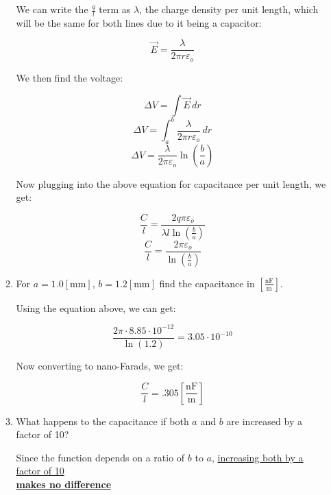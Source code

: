 \begin{enumerate}
\begin{enumerate}
        We can write the $\frac{q}{l}$ term as $\lambda$, the charge density per unit length, which will be the same for both lines due to it being a capacitor:

        $$\vec{E}=\frac{\lambda}{2\pi r\varepsilon_o}$$

        We then find the voltage:

        $$\Delta V=\int\vec{E}\,dr$$
        $$\Delta V=\int_a^b\frac{\lambda}{2\pi r\varepsilon_o}\,dr$$
        $$\Delta V=\frac{\lambda}{2\pi\varepsilon_o}\ln(\frac{b}{a})$$

        Now plugging into the above equation for capacitance per unit length, we get:

        $$\frac{C}{l}=\frac{2q\pi\varepsilon_o}{\lambda l\ln\left( \frac{b}{a} \right)}$$
        $$\boxed{\frac{C}{l}=\frac{2\pi\varepsilon_o}{\ln\left( \frac{b}{a} \right)}}$$

      \item For $a=1.0[\si{\milli\meter}]$, $b=1.2[\si{\milli\meter}]$ find the capacitance in $\left[ \frac{\si{\nano\farad}}{\si{\meter}} \right]$.

        Using the equation above, we can get:

        $$\frac{2\pi\cdot8.85\cdot10^{-12}}{\ln(1.2)}=3.05\cdot10^{-10}$$

        Now converting to nano-Farads, we get:

        $$\boxed{\frac{C}{l}=.305\left[ \frac{\si{\nano\farad}}{\si{\meter}} \right]}$$

      \item What happens to the capacitance if both $a$ and $b$ are increased by a factor of 10?

      Since the function depends on a ratio of $b$ to $a$, \underline{increasing both by a factor of 10}\\\underline{\textbf{makes no difference}}

    \end{enumerate}

\end{enumerate}



